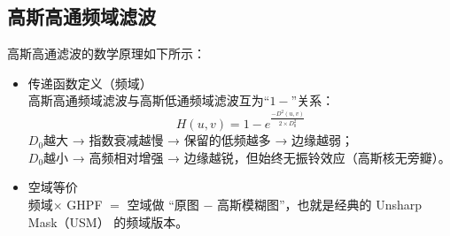 \documentclass[11pt]{article}
\begin{document}
    \begin{center}
    \end{center}
\subsection{高斯高通频域滤波}
	高斯高通滤波的数学原理如下所示：
	\begin{itemize}
		\item 传递函数定义（频域）\\
		高斯高通频域滤波与高斯低通频域滤波互为“$1 −$”关系：
		$$H(u,v) = 1 - e^{\frac{−D^{2}(u,v)}{2 \times D_{0}^2} }$$
		$D_0$越大 → 指数衰减越慢 → 保留的低频越多 → 边缘越弱；\\
		$D_0$越小 → 高频相对增强 → 边缘越锐，但始终无振铃效应（高斯核无旁瓣）。
		\item 空域等价\\
		频域$\times$ GHPF $=$ 空域做 “原图 − 高斯模糊图”，也就是经典的 Unsharp Mask（USM） 的频域版本。
	\end{itemize}
    
\end{document}
